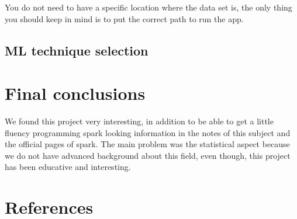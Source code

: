 You do not need to have a specific location where the data set is, the only thing you should keep in mind is to put the correct path to run the app.

\subsection{ML technique selection}

\section{Final conclusions}

We found this project very interesting, in addition to be able to get a little fluency programming spark looking information in the notes of this subject and the official pages of spark. The main problem was the statistical aspect because we do not have advanced background about this field, even though, this project has been educative and interesting.

\section{References}

